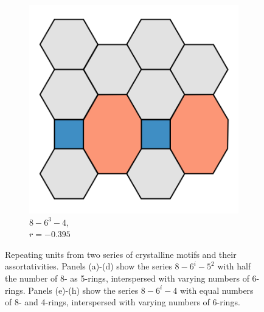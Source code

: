 \begin{figure}[h!]
\begin{subfigure}[b]{0.15\textwidth}
         \includegraphics[width=\textwidth]{./appendices/figures/crystal_8_63_4.pdf}
         \caption{$8 - 6^3 - 4$, \\$r=-0.395$}
         \label{appfig:8634}
     \end{subfigure}
     \hfill
     
	
     \caption{Repeating units from two series of crystalline motifs and their assortativities.
      Panels (a)\--(d) show the series $8-6^i-5^2$ with half the number of 8\-- as 5\--rings, interspersed with varying numbers of 6\--rings. Panels (e)\--(h) show the series $8-6^i-4$ with equal numbers of 8\-- and 4\--rings, interspersed with varying numbers of 6\--rings.}
     \label{appfig:crystals}
\end{figure}

\resumetocwriting